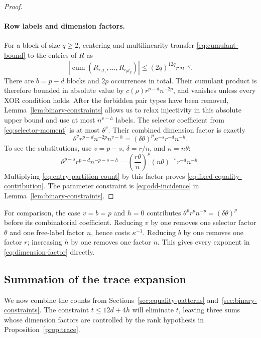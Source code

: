 \documentclass[11pt]{article}
\theoremstyle{definition}
\theoremstyle{remark}
\theoremstyle{plain}
\DeclareMathOperator{\cum}{cum}
\begin{document}
\begin{proof}
\paragraph{Row labels and dimension factors.}
For a block of size $q\ge2$, centering and multilinearity transfer
\eqref{eq:cumulant-bound} to the entries of $R$ as
\[
 \left|\cum(R_{i_1j_1},\ldots,R_{i_qj_q})\right|
       \le(2q)^{12q}r\,n^{-q}.
\]
There are $b=p-d$ blocks and $2p$ occurrences in total. Their
cumulant product is therefore bounded in absolute value by
$c(\rho)r^{p-d}n^{-2p}$, and vanishes unless every XOR condition
holds. After the forbidden pair
types have been removed, Lemma~\ref{lem:binary-constraints} allows
us to relax injectivity in this absolute upper bound and use at
most $n^{v-h}$ labels. The selector coefficient from
\eqref{eq:selector-moment} is at most $\theta^v$.
Their combined dimension factor is exactly
\begin{equation}\label{eq:dimension-factor}
 \theta^v r^{p-d}n^{-2p}n^{v-h}
            =(\delta\theta)^p\kappa^{-s}r^{-d}n^{-h}.
\end{equation}
To see the substitutions, use $v=p-s$, $\delta=r/n$, and
$\kappa=n\theta$:
\[
 \theta^{p-s}r^{p-d}n^{-p-s-h}
       =\left(\frac{r\theta}{n}\right)^p
          (n\theta)^{-s}r^{-d}n^{-h}.
\]
Multiplying \eqref{eq:entry-partition-count} by this factor proves
\eqref{eq:fixed-equality-contribution}. The parameter constraint is
\eqref{eq:odd-incidence} in Lemma~\ref{lem:binary-constraints}.
\end{proof}

For comparison, the case $v=b=p$ and $h=0$ contributes
$\theta^pr^pn^{-p}=(\delta\theta)^p$ before its combinatorial
coefficient. Reducing $v$ by one removes one selector factor
$\theta$ and one free-label factor $n$, hence costs $\kappa^{-1}$.
Reducing $b$ by one removes one factor $r$; increasing $h$ by one
removes one factor $n$. This gives every exponent in
\eqref{eq:dimension-factor} directly.

\subsection{Summation of the trace expansion}\label{sec:trace-summation}

We now combine the counts from Sections~\ref{sec:equality-patterns}
and~\ref{sec:binary-constraints}. The constraint $t\le12d+4h$
will eliminate $t$, leaving three sums whose dimension factors
are controlled by the rank hypothesis in Proposition~\ref{prop:trace}.
\end{document}
